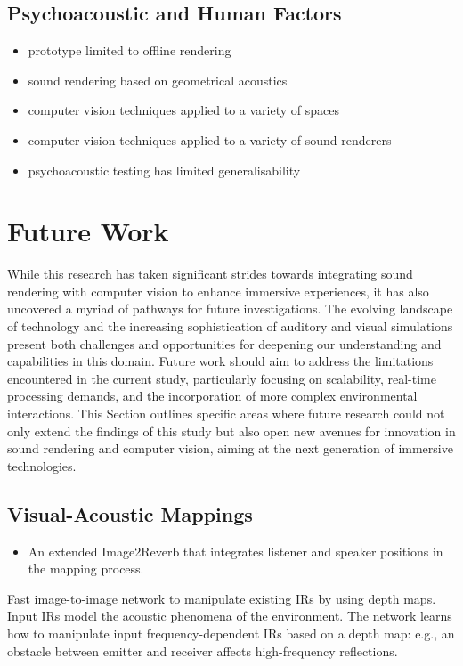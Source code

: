 \subsection{Psychoacoustic and Human Factors}


\begin{itemize}
    \item prototype limited to offline rendering
    \item sound rendering based on geometrical acoustics
    \item computer vision techniques applied to a variety of spaces
    \item computer vision techniques applied to a variety of sound renderers
    \item psychoacoustic testing has limited generalisability
\end{itemize}

\section{Future Work}
While this research has taken significant strides towards integrating sound rendering with computer vision to enhance immersive experiences, it has also uncovered a myriad of pathways for future investigations. The evolving landscape of technology and the increasing sophistication of auditory and visual simulations present both challenges and opportunities for deepening our understanding and capabilities in this domain. Future work should aim to address the limitations encountered in the current study, particularly focusing on scalability, real-time processing demands, and the incorporation of more complex environmental interactions. This Section outlines specific areas where future research could not only extend the findings of this study but also open new avenues for innovation in sound rendering and computer vision, aiming at the next generation of immersive technologies.

\subsection{Visual-Acoustic Mappings}
\begin{itemize}
    \item An extended Image2Reverb that integrates listener and speaker positions in the mapping process.
\end{itemize}

Fast image-to-image network to manipulate existing IRs by using depth maps. Input IRs model the acoustic phenomena of the environment. The network learns how to manipulate input frequency-dependent IRs based on a depth map: e.g., an obstacle between emitter and receiver affects high-frequency reflections.

